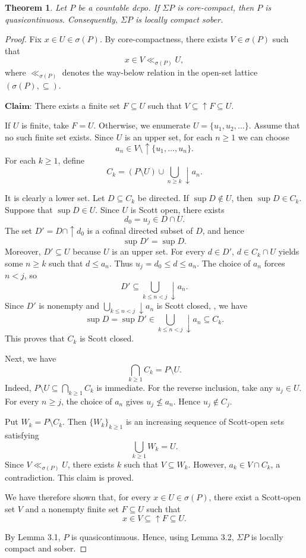 \documentclass[10pt,a4paper]{amsart}
\newtheorem{theorem}{Theorem}
\begin{document}
\begin{theorem}
{\rm Let $P$ be a countable dcpo. If
$\Sigma P$ is core-compact, then $P$ is
quasicontinuous. Consequently, $\Sigma P$ is locally compact
sober.}
\end{theorem}

\begin{proof} Fix $x\in U\in\sigma(P)$. By core-compactness, there exists
$V\in\sigma(P)$ such that
$$
x\in V\ll_{\sigma(P)}U,
$$
where $\ll_{\sigma(P)}$ denotes the way-below relation in the
open-set lattice $(\sigma(P),\subseteq)$.

$\mathbf{Claim}$: There exists a finite set $F\subseteq U$ such that $V\subseteq\uparrow F\subseteq U$.

If $U$ is finite, take $F=U$. Otherwise, we enumerate $U=\{u_1,u_2,\ldots\}$.
Assume that no such finite set exists.
Since $U$ is an upper set, for each $n\geq1$ we can choose
$$
a_n\in V\setminus\uparrow\{u_1,\ldots,u_n\}.
$$
For each $k\geq1$, define
$$
C_k=(P\setminus U)\cup\bigcup_{n\geq k}\downarrow a_n.
$$

It is clearly a lower set. Let $D\subseteq C_k$ be directed.
If $\sup D\notin U$, then $\sup D\in C_k$.
Suppose that $\sup D\in U$. Since $U$ is Scott open,
there exists
$$
d_0=u_j\in D\cap U.
$$
The set $D'=D\cap\uparrow d_0$ is a cofinal directed subset
of $D$, and hence
$$
\sup D'=\sup D.
$$
Moreover, $D'\subseteq U$ because $U$ is an upper set.
For every $d\in D'$,  $d\in C_k\cap U$ yields
some $n\geq k$ such that $d\leq a_n$.
Thus $u_j=d_0\leq d\leq a_n$.
The choice of $a_n$ forces $n<j$, so
$$
D'\subseteq\bigcup_{k\leq n<j}\downarrow a_n.
$$
Since $D'$ is nonempty and $\bigcup\limits_{k\leq n<j}\downarrow a_n$ is Scott closed,
, we have
$$
\sup D=\sup D'
\in\bigcup_{k\leq n<j}\downarrow a_n
\subseteq C_k.
$$
This proves that $C_k$ is Scott closed.

Next, we have
$$
\bigcap_{k\geq1}C_k=P\setminus U.
$$
Indeed, $P\setminus U\subseteq\bigcap_{k\geq1}C_k$ is immediate.
For the reverse inclusion, take any $u_j\in U$.
For every $n\geq j$, the choice of $a_n$ gives
$u_j\nleq a_n$. Hence $u_j\notin C_j$.

Put $W_k=P\setminus C_k$.
Then $\{W_k\}_{k\geq1}$ is an increasing sequence of Scott-open
sets satisfying
$$
\bigcup_{k\geq1}W_k=U.
$$
Since $V\ll_{\sigma(P)}U$, there exists $k$ such that
$V\subseteq W_k$. However, $a_k\in V\cap C_k$, a contradiction.
This claim is proved.

We have therefore shown that, for every $x\in U\in\sigma(P)$,
there exist a Scott-open set $V$ and a nonempty finite set
$F\subseteq U$ such that
$$
x\in V\subseteq\uparrow F\subseteq U.
$$

By Lemma 3.1, $P$ is quasicontinuous. Hence, using Lemma 3.2, $\Sigma P$ is locally compact and sober.
\end{proof}
\end{document}
